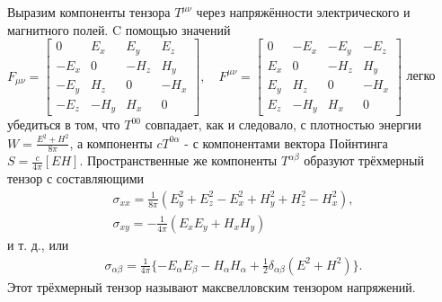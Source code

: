 \documentclass[__main__.tex]{subfiles}
\begin{document}
Выразим компоненты тензора $T^{\mu\nu}$ через напряжённости электрического и магнитного полей. C помощью значений 
$F_{\mu\nu}= 
\begin{bmatrix}
0 & E_x & E_y & E_z\\
-E_x & 0 & -H_z & H_y\\
-E_y & H_z & 0 & -H_x\\
-E_z & -H_y & H_x & 0
\end{bmatrix},
\quad F^{\mu\nu} = 
\begin{bmatrix}
0 & -E_x & -E_y & -E_z\\
E_x & 0 & -H_z & H_y\\
E_y & H_z & 0 & -H_x\\
E_z & -H_y & H_x & 0
\end{bmatrix}
$
легко убедиться в том, что $T^{00}$ совпадает, как и следовало, с плотностью энергии $W = \frac{E^2 + H^2}{8\pi}$, а компоненты $cT^{0\alpha}$ - с компонентами вектора Пойнтинга $S = \frac{c}{4\pi}[EH]$. Пространственные же компоненты $T^{\alpha\beta}$ образуют трёхмерный тензор с составляющими
\begin{gather*}
\sigma_{xx} = \frac{1}{8\pi}(E^2_y + E^2_z - E^2_x + H^2_y + H^2_z - H^2_x),\\
\sigma_{xy} = -\frac{1}{4\pi}(E_xE_y + H_xH_y)
\end{gather*}
и т. д., или
\begin{gather*}
\sigma_{\alpha\beta} = \frac{1}{4\pi}\{-E_\alpha E_\beta - H_\alpha H_\alpha + \frac{1}{2}\delta_{\alpha\beta}(E^2 + H^2)\}.
\end{gather*}
Этот трёхмерный тензор называют максвелловским тензором напряжений.
\end{document}
